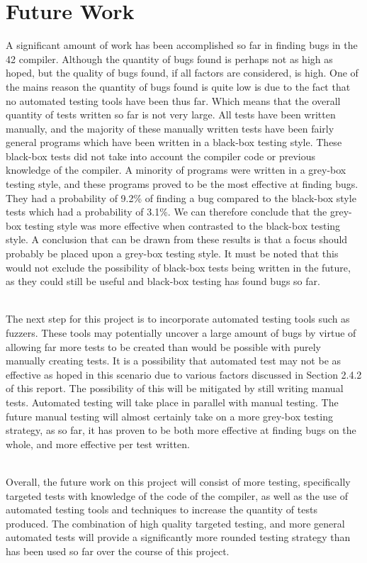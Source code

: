 \chapter{Future Work}\label{C:con}
A significant amount of work has been accomplished so far in finding bugs in the 42 compiler. Although the quantity of bugs found is perhaps not as high as hoped, but the quality of bugs found, if all factors are considered, is high. One of the mains reason the quantity of bugs found is quite low is due to the fact that no automated testing tools have been thus far. Which means that the overall quantity of tests written so far is not very large. All tests have been written manually, and the majority of these manually written tests have been fairly general programs which have been written in a black-box testing style. These black-box tests did not take into account the compiler code or previous knowledge of the compiler. A minority of programs were written in a grey-box testing style, and these programs proved to be the most effective at finding bugs. They had a probability of 9.2\% of finding a bug compared to the black-box style tests which had a probability of 3.1\%. We can therefore conclude that the grey-box testing style was more effective when contrasted to the black-box testing style. A conclusion that can be drawn from these results is that a focus should probably be placed upon a grey-box testing style. It must be noted that this would not exclude the possibility of black-box tests being written in the future, as they could still be useful and black-box testing has found bugs so far.

~\\
The next step for this project is to incorporate automated testing tools such as fuzzers. These tools may potentially uncover a large amount of bugs by virtue of allowing far more tests to be created than would be possible with purely manually creating tests. It is a possibility that automated test may not be as effective as hoped in this scenario due to various factors discussed in Section 2.4.2 of this report. The possibility of this will be mitigated by still writing manual tests. Automated testing will take place in parallel with manual testing. The future manual testing will almost certainly take on a more grey-box testing strategy, as so far, it has proven to be both more effective at finding bugs on the whole, and more effective per test written. 

~\\
Overall, the future work on this project will consist of more testing, specifically targeted tests with knowledge of the code of the compiler, as well as the use of automated testing tools and techniques \cite{Miller:1995} \cite{javaAfl} \cite{javaFuzz} \cite{Chen:2017} \cite{Chen:2016} to increase the quantity of tests produced. The combination of high quality targeted testing, and more general automated tests will provide a significantly more rounded testing strategy than has been used so far over the course of this project.


